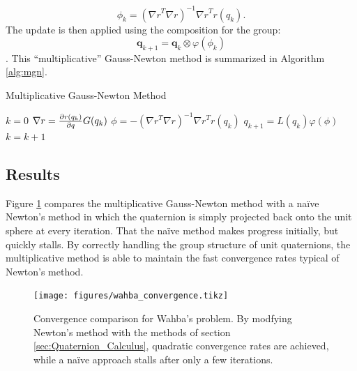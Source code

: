 \documentclass[letterpaper, 10 pt, conference]{ieeeconf}  %
\newcommand{\q}{\textbf{q}}
\begin{document}
    \begin{equation}
    	\phi_k = ({\nabla r}^T {\nabla r})^{-1} {\nabla r}^T r(q_k).
    \end{equation}
	The update is then applied using the composition for the group:
	\begin{equation}
		\q_{k+1} = \q_k \otimes \varphi(\phi_k)
	\end{equation}.
	This ``multiplicative'' Gauss-Newton method is summarized in Algorithm \ref{alg:mgn}.

    \begin{algorithm} 
    	\begin{algorithmic}[1]
    		\caption{Multiplicative Gauss-Newton Method}\label{alg:mgn}
    		\State $k = 0$
    		    \State ${\nabla r} = \pdv{r(q_k)}{q} G(q_k)$ 
    		    \State $ \phi = -({\nabla r}^T {\nabla r})^{-1} {\nabla r}^T r(q_k)$ 
    		    \State $q_{k+1} = L(q_k) \varphi(\phi)$ 
    		    \State $k = k + 1$
    		\EndWhile
    	\end{algorithmic}
    \end{algorithm}



    \subsection{Results}
    Figure \ref{fig:wahba_convergence} compares the multiplicative Gauss-Newton method with a na\"ive Newton's method in which the quaternion is simply projected back onto the unit sphere at every iteration. That the na\"ive method makes progress
    initially, but quickly stalls.
    By correctly handling the group structure of unit quaternions, the multiplicative method is able
    to maintain the fast convergence rates typical of Newton's method.
    \begin{figure}

        \centering
        \texttt{[image: figures/wahba\_convergence.tikz]}
        \caption{Convergence comparison for Wahba's problem. By modfying Newton's method
        with the methods of section \ref{sec:Quaternion_Calculus}, quadratic convergence
        rates are achieved, while a na\"ive approach stalls after only a few
        iterations.}
        \label{fig:wahba_convergence}
    \end{figure}
\end{document}

